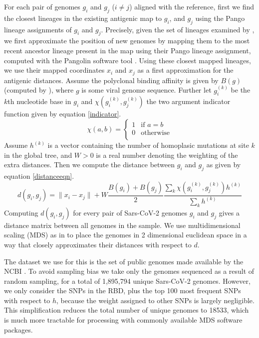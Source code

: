 \documentclass{article}
\begin{document}
For each pair of genomes $g_i$ and $g_j$ ($i\neq j$) aligned with the reference, first we find the closest lineages in the existing antigenic map to $g_i$, and $g_j$ using the Pango lineage assignments of $g_i$ and $g_j$. Precisely, given the set of lineages examined by \cite{wilksMappingSARSCoV2Antigenic2022}, we first approximate the position of new genomes by mapping them to the most recent ancestor lineage present in the map using their Pango lineage assignment, computed with the Pangolin software tool \cite{o2021assignment}. Using these closest mapped lineages, we use their mapped coordinates $x_i$ and $x_j$ as a first approximation for the antigenic distances.
Assume the polyclonal binding affinity is given by $B(g)$ (computed by \cite{greaney2022antibody}), where $g$ is some viral genome sequence. Further let $g_i^{(k)}$ be the $k$th nucleotide base in $g_i$ and $\chi(g_i^{(k)},g_j^{(k)})$ the two argument indicator function given by equation \ref{indicator}.
\begin{equation}
        \chi(a,b) =   \begin{cases}
        1 & \text{if $a = b$} \\
        0 & \text{otherwise} \\
    \end{cases}
    \label{indicator}
\end{equation}
Assume $h^{(k)}$ is a vector containing the number of homoplasic mutations at site $k$ in the global tree, and $W>0$ is a real number denoting the weighting of the extra distances.
Then we compute the distance between $g_i$ and $g_j$ as given by equation \ref{distanceeqn}.
\begin{equation}
    d(g_i,g_j) = \lVert x_i - x_j \rVert + W \frac{B(g_i) + B(g_j)}{2}\frac{\sum_k \chi\left(g_i^{(k)},g_j^{(k)}\right) h^{(k)}}{\sum_k h^{(k)}}
    \label{distanceeqn}
\end{equation}
Computing $d(g_i, g_j)$ for every pair of Sars-CoV-2 genomes $g_i$ and $g_j$ gives a distance matrix between all genomes in the sample.
We use multidimensional scaling (MDS) as in \cite{wilksMappingSARSCoV2Antigenic2022, lapedesGeometryShapeSpace2001} to place the genomes in 2 dimensional euclidean space in a way that closely approximates their distances with respect to $d$.


The dataset we use for this is the set of public genomes made available by the NCBI \cite{sayers2019database}. 
To avoid sampling bias we take only the genomes sequenced as a result of random sampling, for a total of 1,895,794 unique Sars-CoV-2 genomes.
However, we only consider the SNPs in the RBD, plus the top 100 most frequent SNPs with respect to $h$, because the weight assigned to other SNPs is largely negligible. 
This simplification reduces the total number of unique genomes to 18533, which is much more tractable for processing with commonly available MDS software packages.
\end{document}
